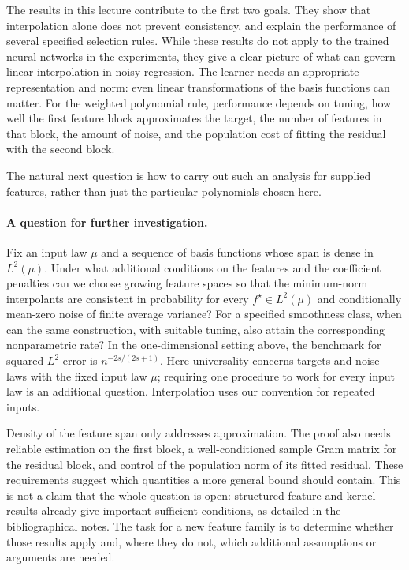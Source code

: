 \documentclass[11pt,twoside]{article}
\theoremstyle{definition}
\theoremstyle{remark}
\begin{document}
The results in this lecture contribute to the first two goals. They show
that interpolation alone does not prevent consistency, and explain the
performance of several specified selection rules. While these results do
not apply to the trained neural networks in the experiments, they give a
clear picture of what can govern linear interpolation in noisy regression.
The learner needs an appropriate representation and norm: even linear
transformations of the basis functions can matter. For the weighted
polynomial rule, performance depends on tuning, how well the first feature
block approximates the target, the number of features in that block, the
amount of noise, and the population cost of fitting the residual with the
second block.
\label{en:random-neural-interpolation}

The natural next question is how to carry out such an analysis for supplied
features, rather than just the particular polynomials chosen here.

\paragraph{A question for further investigation.}
Fix an input law $\mu$ and a sequence of basis functions whose span is dense
in $L^2(\mu)$. Under what additional conditions on the features and the
coefficient penalties can we choose growing feature spaces so that the
minimum-norm interpolants are consistent in probability for every
$f^\star\in L^2(\mu)$ and conditionally mean-zero noise of finite average
variance? For a specified smoothness class, when can the same construction,
with suitable tuning, also attain the corresponding nonparametric rate?
In the one-dimensional setting above, the benchmark for squared $L^2$
error is $n^{-2s/(2s+1)}$. Here universality concerns targets and noise laws
with the fixed input law $\mu$; requiring one procedure to work for every
input law is an additional question. Interpolation uses our convention
for repeated inputs.

Density of the feature span only addresses approximation. The proof also
needs reliable estimation on the first block, a well-conditioned sample
Gram matrix for the residual block, and control of the population norm of
its fitted residual. These requirements suggest which quantities a more
general bound should contain. This is not a claim that the whole question
is open: structured-feature and kernel results already give important
sufficient conditions, as detailed in the bibliographical notes. The task
for a new feature family is to determine whether those results apply and,
where they do not, which additional assumptions or arguments are needed.
\end{document}
